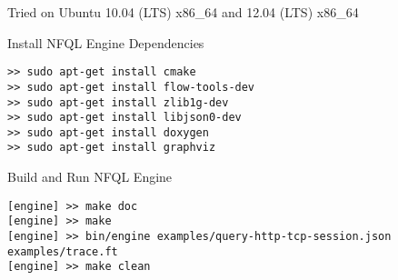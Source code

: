 Tried on Ubuntu 10.04 (LTS) x86\_64 and 12.04 (LTS) x86\_64

Install NFQL Engine Dependencies

\begin{lstlisting}
>> sudo apt-get install cmake
>> sudo apt-get install flow-tools-dev
>> sudo apt-get install zlib1g-dev
>> sudo apt-get install libjson0-dev
>> sudo apt-get install doxygen
>> sudo apt-get install graphviz
\end{lstlisting}

Build and Run NFQL Engine

\begin{lstlisting}
[engine] >> make doc
[engine] >> make
[engine] >> bin/engine examples/query-http-tcp-session.json examples/trace.ft
[engine] >> make clean
\end{lstlisting}
